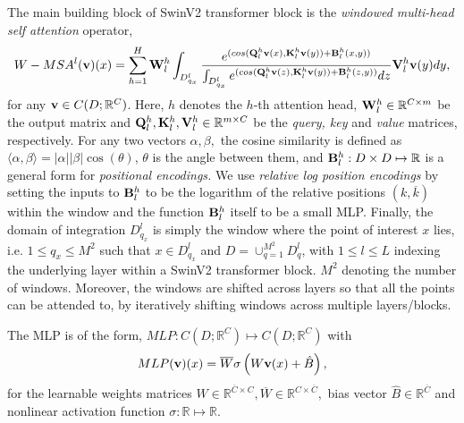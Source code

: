 \documentclass[reqno,10pt]{amsart}
\theoremstyle{plain}
\theoremstyle{definition}
\newcommand{\bb}[1]{\mathbb{#1}}
\begin{document}
\noindent The main building block of SwinV2 transformer block is the {\it windowed multi-head self attention} operator,
\begin{equation} \label{eq:wmsa}
    W-MSA^l({\bf v})(x) = \sum_{h=1}^{H} {\bf W}^h_l \int_{D^l_{q_x}} \frac{e^{(cos({\bf Q}^h_l {\bf v}(x),{\bf K}^h_l {\bf v}(y))+{\bf B}^h_l(x,y))}}{\int_{D_{q_x}^l} e^{(cos({\bf Q}^h_l {\bf v}(z),{\bf K}^h_l {\bf v}(y))+{\bf B}^h_l(z,y))}dz} {\bf V}^h_l {\bf v}(y) dy,
\end{equation}
for any ${\bf v} \in C(D;\bb R^C)$. Here, $h$ denotes the $h$-th attention head, ${\bf W}^h_l \in \bb R^{C\times m}$ be the output matrix and ${\bf Q}^h_l, {\bf K}^h_l, {\bf V}^h_l \in \bb R^{m \times C}$ be the {\it query, key} and {\it value} matrices, respectively. For any two vectors $\alpha, \beta,$ the cosine similarity is defined as $\langle\alpha, \beta\rangle = |\alpha||\beta| \cos(\theta)$, $\theta$ is the angle between them, and ${\bf B}^h_l : D \times D \mapsto \bb R$ is a general form for {\it positional encodings.} We use {\it relative log position encodings} by setting the inputs to ${\bf B}^h_l$ to be the logarithm of the relative positions $(k,\overline{k})$ within the window and the function ${\bf B}^h_l$ itself to be a small MLP. Finally, the domain of integration $D^l_{q_x}$ is simply the window where the point of interest $x$ lies, i.e. $1 \leq q_x \leq M^2$ such that $x \in D^l_{q_x}$ and $D = \cup_{q=1}^{M^2} D^l_q$, with $1 \leq l \leq L$ indexing the underlying layer within a SwinV2 transformer block. $M^2$ denoting the number of windows. Moreover, the windows are shifted across layers so that all the points can be attended to, by iteratively shifting windows across multiple layers/blocks.

\noindent The MLP is of the form, $MLP: C(D;\bb R^C) \mapsto C(D;\bb R^C)$ with 
\begin{equation}\label{eq:mlp}
    MLP({\bf v})(x) = \overline{W} \sigma\left(W{\bf v}(x) + \hat{B}\right),
\end{equation}
for the learnable weights matrices $W \in \bb R^{\overline{C}\times C}, \overline{W} \in \bb R^{C\times \overline{C}},$ bias vector $\hat{B} \in \bb R^{\overline{C}}$ and nonlinear activation function $\sigma : \bb R\mapsto \bb R$.













\end{document}

